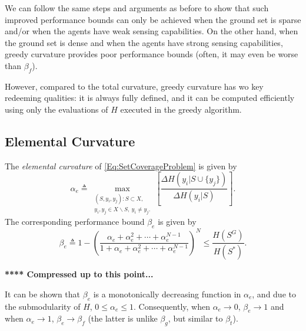 \documentclass[letterpaper, 10 pt, conference]{ieeeconf}
\begin{document}
We can follow the same steps and arguments as before to show that such improved performance bounds can only be achieved when the ground set is sparse and/or when the agents have weak sensing capabilities. On the other hand, when the ground set is dense and when the agents have strong sensing capabilities, greedy curvature provides poor performance bounds (often, it may even be worse than $\beta_f$). 

However, compared to the total curvature, greedy curvature has wo key redeeming qualities: it is always fully defined, and it can be computed efficiently using only the evaluations of $H$ executed in the greedy algorithm.





\subsection{Elemental Curvature \cite{Wang2016}}\label{SubSec:ElementalCurvature}

The \emph{elemental curvature} of \eqref{Eq:SetCoverageProblem} is given by 
\begin{equation}\label{Eq:ElementalCurvatureCoefficientTheory}
    \alpha_e \triangleq \max_{\substack{(S,y_i,y_j): S \subset X,\\ y_i,y_j \in X \backslash S,\ y_i \neq y_j.}}\left[\frac{\Delta H(y_i \vert S \cup \{y_j\})}{\Delta H(y_i \vert S)}\right].
\end{equation}
The corresponding performance bound $\beta_e$ is given by 
\begin{equation}\label{Eq:ElementalCurvatureBoundTheory}
    \beta_e \triangleq 1-\left(\frac{\alpha_e + \alpha_e^2 + \cdots + \alpha_e^{N-1}}{1 + \alpha_e + \alpha_e^2 + \cdots + \alpha_e^{N-1}}\right)^N \leq \frac{H(S^G)}{H(S^*)}.
\end{equation}

\bigskip
{\color{blue} \textbf{**** Compressed up to this point...} }
\bigskip


It can be shown that $\beta_e$ is a monotonically decreasing function in $\alpha_e$, and due to the submodularity of $H$, $0 \leq \alpha_e \leq 1$. Consequently, when $\alpha_e \rightarrow 0$, $\beta_e \rightarrow 1$ and when $\alpha_e \rightarrow 1$, $\beta_e \rightarrow \beta_f$ (the latter is unlike $\beta_g$, but similar to $\beta_t$).
\end{document}
